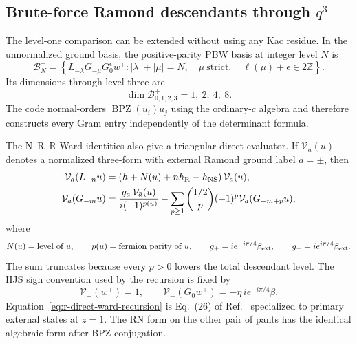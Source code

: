 \documentclass[11pt]{article}
\newcommand{\NS}{\mathrm{NS}}
\newcommand{\R}{\mathrm{R}}
\begin{document}
\subsection{Brute-force Ramond descendants through \texorpdfstring{$q^3$}{q3}}
\label{sec:r-bruteforce-q3}

The level-one comparison can be extended without using any Kac residue.
In the unnormalized ground basis, the positive-parity PBW basis at integer
level $N$ is
\begin{equation}
 \mathcal B_N^+
 =\left\{
 L_{-\lambda}G_{-\mu}G_0^\epsilon w^+:
 |\lambda|+|\mu|=N,\quad
 \mu\ \text{strict},\quad
 \ell(\mu)+\epsilon\in2\mathbb Z
 \right\}.
 \label{eq:r-pbw-basis}
\end{equation}
Its dimensions through level three are
\begin{equation}
 \dim\mathcal B_{0,1,2,3}^+=1,\ 2,\ 4,\ 8.
 \label{eq:r-pbw-dimensions}
\end{equation}
The code normal-orders
$\operatorname{BPZ}(u_i)u_j$ using the ordinary-$c$ algebra and therefore
constructs every Gram entry independently of the determinant formula.

The N--R--R Ward identities also give a triangular direct evaluator.  If
$\mathcal V_a(u)$ denotes a normalized three-form with external Ramond
ground label $a=\pm$, then
\begin{align}
 \mathcal V_a(L_{-n}u)
 &=
 \left(h+N(u)+n h_{\R}-h_{\NS}\right)\mathcal V_a(u),
 \notag\\
 \mathcal V_a(G_{-m}u)
 &=
 \frac{g_a\,\mathcal V_{\bar a}(u)}
      {i(-1)^{p(u)}}
 -\sum_{p\ge1}
 \binom{1/2}{p}(-1)^p
 \mathcal V_a(G_{-m+p}u),
 \label{eq:r-direct-ward-recursion}
\end{align}
where
\begin{equation}
 N(u)=\text{level of }u,\qquad p(u)=\text{fermion parity of }u,
 \qquad
 g_+=i e^{-i\pi/4}\beta_{\rm ext},
 \qquad
 g_-=i e^{i\pi/4}\beta_{\rm ext}.
\end{equation}
The sum truncates because every $p>0$ lowers the total descendant level.
The HJS sign convention used by the recursion is fixed by
\begin{equation}
 \mathcal V_+(w^+)=1,\qquad
 \mathcal V_-(G_0w^+)
 =-\eta\,i e^{-i\pi/4}\beta .
 \label{eq:r-direct-ground-form}
\end{equation}
Equation~\eqref{eq:r-direct-ward-recursion} is Eq.~(26) of
Ref.~\cite{Suchanek2011EllipticRecursion} specialized to primary external
states at $z=1$.  The RN form on the other pair of pants has the identical
algebraic form after BPZ conjugation.
\end{document}
